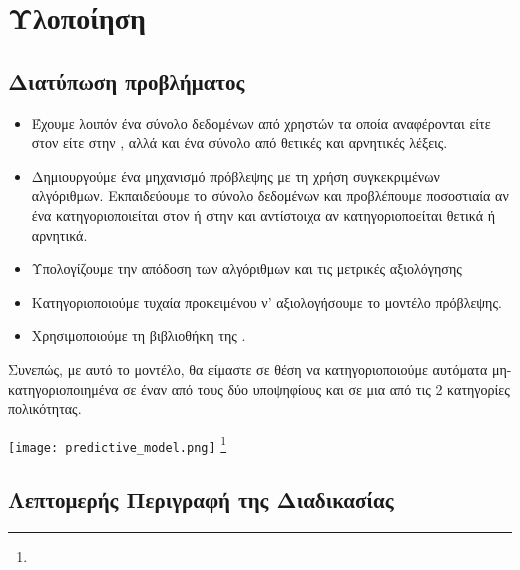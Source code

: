\documentclass{beamer}
\begin{document}
\section{Υλοποίηση}

\subsection{Διατύπωση προβλήματος}

\begin{frame}
\begin{itemize}
\item Έχουμε λοιπόν ένα σύνολο δεδομένων από {} χρηστών τα οποία αναφέρονται είτε στον {} είτε στην {}, αλλά και ένα σύνολο από θετικές και αρνητικές λέξεις.
\item Δημιουργούμε ένα μηχανισμό πρόβλεψης με τη χρήση συγκεκριμένων αλγόριθμων. Εκπαιδεύουμε το σύνολο δεδομένων και προβλέπουμε ποσοστιαία αν ένα {} κατηγοριοποιείται στον {} ή στην {} και αντίστοιχα αν κατηγοριοποείται θετικά ή αρνητικά.
\item Υπολογίζουμε την απόδοση των αλγόριθμων και τις μετρικές αξιολόγησης
\item Κατηγοριοποιούμε τυχαία {} προκειμένου ν' αξιολογήσουμε το μοντέλο πρόβλεψης. 
\item Χρησιμοποιούμε τη βιβλιοθήκη {} της {}.
\vfill
\end{itemize}
\end{frame}

\begin{frame}
Συνεπώς, με αυτό το μοντέλο, θα είμαστε σε θέση να κατηγοριοποιούμε αυτόματα μη-κατηγοριοποιημένα {} σε έναν από τους δύο υποψηφίους και σε μια από τις 2 κατηγορίες πολικότητας.
\begin{table}[!h]
\begin{center}
\texttt{[image: predictive\_model.png]} \footnote{{}}
\end{center} 

\end{table}
\end{frame}

\subsection{Λεπτομερής Περιγραφή της Διαδικασίας}
\end{document}
